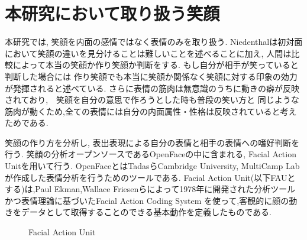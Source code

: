 \section{本研究において取り扱う笑顔}
本研究では, 笑顔を内面の感情ではなく表情のみを取り扱う. %
Niedenthalは初対面において笑顔の違いを見分けることは難しいことを述べることに加え,
人間は比較によって本当の笑顔か作り笑顔か判断をする. もし自分が相手が笑っていると判断した場合には
作り笑顔でも本当に笑顔か関係なく笑顔に対する印象の効力が発揮されると述べている.\cite{niedenthal2010simulation}
さらに表情の筋肉は無意識のうちに動きの癖が反映されており,　笑顔を自分の意思で作ろうとした時も普段の笑い方と
同じような筋肉が動くため,全ての表情には自分の内面属性・性格は反映されていると考えためである.



笑顔の作り方を分析し, 表出表現による自分の表情と相手の表情への嗜好判断を行う.
笑顔の分析オープンソースであるOpenFaceの中に含まれる, Facial Action Unitを用いて行う.
OpenFaceとはTadasらCambridge University, MultiCamp Labが作成した表情分析を行うためのツールである.
Facial Action Unit(以下FAUとする)は,Paul Ekman,Wallace Friesenらによって1978年に開発された分析ツールかつ表情理論に基づいたFacial Action Coding System
を使って,客観的に顔の動きをデータとして取得することのできる基本動作を定義したものである.
\begin{figure}[htbp]
    \begin{center}
    \end{center}
    \caption{Facial Action Unit}
    \label{fig:faus}
    \end{figure}

